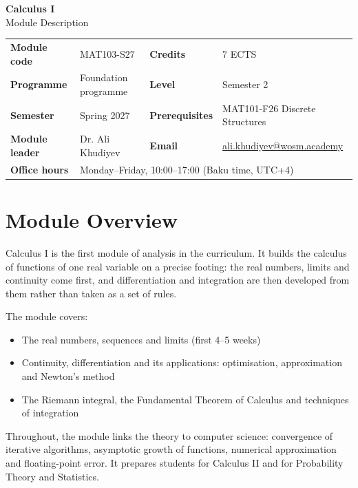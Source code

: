 \documentclass[11pt,a4paper]{article}
\makeatletter
\newcommand{\ModuleTitle}{Calculus I}
\newcommand{\ModuleCode}{MAT103-S27}
\newcommand{\Programme}{Foundation programme}
\newcommand{\Level}{Semester 2}
\newcommand{\Semester}{Spring 2027}
\newcommand{\Credits}{7 ECTS}
\newcommand{\ModuleLeader}{Dr. Ali Khudiyev}
\newcommand{\Email}{ali.khudiyev@wosm.academy}
\newcommand{\OfficeHours}{Monday--Friday, 10:00--17:00 (Baku time, UTC+4)}
\newcommand{\Prerequisites}{MAT101-F26 Discrete Structures}
\makeatother
\begin{document}
\begin{center}
  {\LARGE\bfseries\color{accent} \ModuleTitle}\\[4pt]
  {\large Module Description}
\end{center}
\vspace{6pt}

\begin{tabularx}{\textwidth}{>{\bfseries}l X >{\bfseries}l X}
\toprule
Module code   & \ModuleCode    & Credits      & \Credits \\
Programme     & \Programme     & Level        & \Level \\
Semester      & \Semester      & Prerequisites & \Prerequisites \\
Module leader & \ModuleLeader  & Email        & \href{mailto:\Email}{\Email} \\
Office hours  & \multicolumn{3}{l}{\OfficeHours} \\
\bottomrule
\end{tabularx}

\section{Module Overview}
Calculus I is the first module of analysis in the curriculum. It builds the
calculus of functions of one real variable on a precise footing: the real numbers,
limits and continuity come first, and differentiation and integration are then
developed from them rather than taken as a set of rules.

The module covers:
\begin{itemize}
  \item The real numbers, sequences and limits (first 4--5 weeks)
  \item Continuity, differentiation and its applications: optimisation,
        approximation and Newton's method
  \item The Riemann integral, the Fundamental Theorem of Calculus and techniques of
        integration
\end{itemize}

Throughout, the module links the theory to computer science: convergence of
iterative algorithms, asymptotic growth of functions, numerical approximation and
floating-point error. It prepares students for Calculus II and for Probability
Theory and Statistics.
\end{document}
